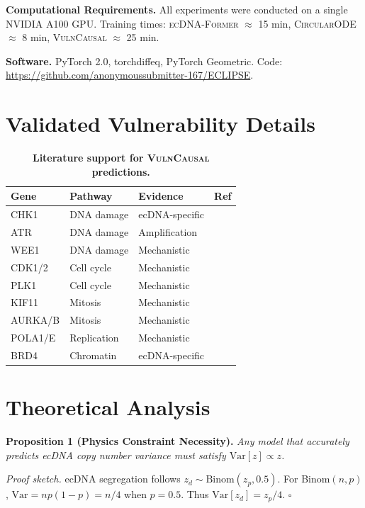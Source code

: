 \documentclass[runningheads]{llncs}
\newcommand{\former}{\textsc{ecDNA-Former}}
\newcommand{\circularode}{\textsc{CircularODE}}
\newcommand{\vulncausal}{\textsc{VulnCausal}}
\begin{document}
\textbf{Computational Requirements.} All experiments were conducted on a single NVIDIA A100 GPU. Training times: \former{} $\approx$ 15 min, \circularode{} $\approx$ 8 min, \vulncausal{} $\approx$ 25 min.

\textbf{Software.} PyTorch 2.0, torchdiffeq, PyTorch Geometric. Code: \url{https://github.com/anonymoussubmitter-167/ECLIPSE}.


\section{Validated Vulnerability Details}
\label{app:vulnerabilities}

\begin{table}[h]
\caption{\textbf{Literature support for \vulncausal{} predictions.}}
\label{tab:vuln_full}
\centering
\footnotesize
\begin{tabular}{@{}llll@{}}
\toprule
Gene & Pathway & Evidence & Ref \\
\midrule
CHK1 & DNA damage & ecDNA-specific & \cite{yi_2024_chk1_ecdna} \\
ATR & DNA damage & Amplification & \cite{shen_2019_atr} \\
WEE1 & DNA damage & Mechanistic & \cite{otto_2017_cell_cycle} \\
CDK1/2 & Cell cycle & Mechanistic & \cite{otto_2017_cell_cycle} \\
PLK1 & Cell cycle & Mechanistic & \cite{gutteridge_2016_plk1} \\
KIF11 & Mitosis & Mechanistic & \cite{zhou_2021_kif11} \\
AURKA/B & Mitosis & Mechanistic & \cite{wilkinson_2007_aurkb} \\
POLA1/E & Replication & Mechanistic & \cite{macheret_2020_replication} \\
BRD4 & Chromatin & ecDNA-specific & \cite{hung_2021_ecdna_hubs} \\
\bottomrule
\end{tabular}
\end{table}


\section{Theoretical Analysis}
\label{app:theory}

\textbf{Proposition 1 (Physics Constraint Necessity).} \textit{Any model that accurately predicts ecDNA copy number variance must satisfy $\text{Var}[z] \propto z$.}

\textit{Proof sketch.} ecDNA segregation follows $z_d \sim \text{Binom}(z_p, 0.5)$. For Binom$(n, p)$, $\text{Var} = np(1-p) = n/4$ when $p=0.5$. Thus $\text{Var}[z_d] = z_p/4$. $\square$
\end{document}
